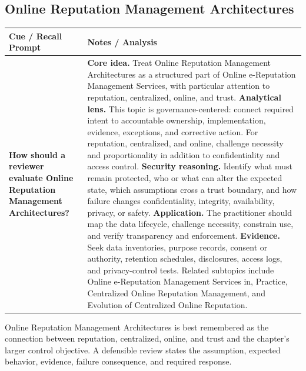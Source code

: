 \documentclass[11pt]{article}
\newcommand{\CornellHeader}{%
\rowcolor{Navy}\color{white}\bfseries Cue / Recall Prompt & \color{white}\bfseries Notes / Analysis\\\hline}
\newcommand{\CornellRow}[2]{%
\cellcolor{CueGray}\RaggedRight\textbf{#1} & \RaggedRight #2\\\hline}
\begin{document}
\subsection*{Online Reputation Management Architectures}
\begin{longtable}{>{\RaggedRight\arraybackslash}p{}|>{\RaggedRight\arraybackslash}p{}}
\CornellHeader
\CornellRow{How should a reviewer evaluate Online Reputation Management Architectures?}{\textbf{Core idea.} Treat Online Reputation Management Architectures as a structured part of Online e-Reputation Management Services, with particular attention to reputation, centralized, online, and trust. \textbf{Analytical lens.} This topic is governance-centered: connect required intent to accountable ownership, implementation, evidence, exceptions, and corrective action. For reputation, centralized, and online, challenge necessity and proportionality in addition to confidentiality and access control. \textbf{Security reasoning.} Identify what must remain protected, who or what can alter the expected state, which assumptions cross a trust boundary, and how failure changes confidentiality, integrity, availability, privacy, or safety. \textbf{Application.} The practitioner should map the data lifecycle, challenge necessity, constrain use, and verify transparency and enforcement. \textbf{Evidence.} Seek data inventories, purpose records, consent or authority, retention schedules, disclosures, access logs, and privacy-control tests. Related subtopics include Online e-Reputation Management Services in, Practice, Centralized Online Reputation Management, and Evolution of Centralized Online Reputation.}
\end{longtable}
\begin{topicsummary}
Online Reputation Management Architectures is best remembered as the connection between reputation, centralized, online, and trust and the chapter's larger control objective. A defensible review states the assumption, expected behavior, evidence, failure consequence, and required response.
\end{topicsummary}
\end{document}
